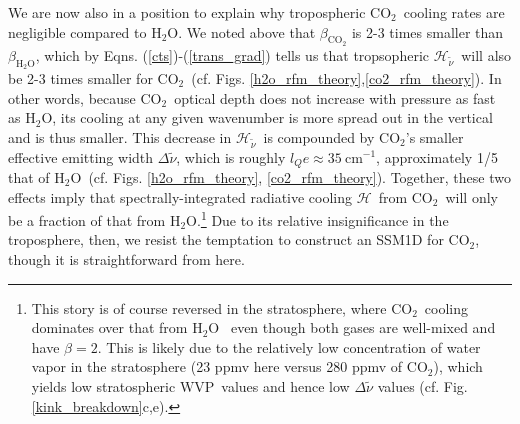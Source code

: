 \documentclass{ametsoc}
\newcommand{\eqnref}[1]{(\ref{#1})}
\newcommand{\cminverse}{\ensuremath{\mathrm{cm^{-1}}}}
\newcommand{\cotwo}{\ensuremath{\mathrm{CO_2}}}
\newcommand{\htwo}{\ensuremath{\mathrm{H_2O}}}
\newcommand{\wv}{\ensuremath{\widetilde{\nu}}}
\newcommand{\ch}{\ensuremath{\mathcal{H}}}
\newcommand{\chk}{\ensuremath{\ch_{\wv}}}
\newcommand{\WVP}{\ensuremath{\mathrm{WVP}}}
\newcommand{\lQ}{\ensuremath{l_{Q}}}
\begin{document}
We are now also in a position to explain why tropospheric \cotwo\ cooling rates are negligible compared to \htwo. We noted above that $\beta_{\cotwo}$ is 2-3 times smaller than $\beta_{\htwo}$, which by Eqns. \eqnref{cts}-\eqnref{trans_grad} tells us that  tropsopheric \chk\ will also be 2-3 times smaller for \cotwo\ (cf.  Figs. \ref{h2o_rfm_theory},\ref{co2_rfm_theory}). In other words, because \cotwo\ optical depth does not increase with pressure as fast as \htwo, its cooling at any given wavenumber is more spread out in the vertical and is thus smaller. This decrease in \chk\ is compounded by \cotwo's smaller effective emitting width $\Delta \wv$, which is roughly $\lQ e \approx 35 \ \cminverse$, approximately 1/5 that of \htwo\ (cf. Figs. \ref{h2o_rfm_theory}, \ref{co2_rfm_theory}). Together, these two effects imply that spectrally-integrated radiative cooling \ch\ from \cotwo\ will only be a fraction of that from \htwo.\footnote{This story is of course reversed in the stratosphere, where \cotwo\ cooling dominates over that from \htwo\ \citep[][]{manabe1964} even though both gases are well-mixed and have $\beta=2$. This is likely due to the relatively low concentration of water vapor in the stratosphere (23 ppmv here  versus 280 ppmv of \cotwo), which yields low stratospheric \WVP\ values and hence low $\Delta \wv$ values (cf. Fig. \ref{kink_breakdown}c,e). } Due to its relative insignificance in the troposphere, then, we resist the temptation to construct an SSM1D for \cotwo, though it is straightforward from here.


 
\end{document}
